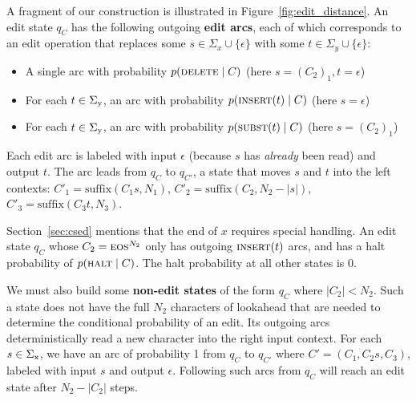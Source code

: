 \documentclass[11pt,letterpaper]{article}
\newcommand{\Sigmax}{\Sigma_{\text x}}
\newcommand{\Sigmay}{\Sigma_{\text y}}
\newcommand{\eos}{\textsc{eos}\xspace}
\newcommand{\SkipForSpace}[1]{}
\begin{document}
A fragment of our construction is illustrated in Figure~\ref{fig:edit_distance}. 
An edit state $q_C$ has the following outgoing {\bf edit arcs}, each of which corresponds to an edit operation that replaces some $s \in \Sigma_x \cup \{\epsilon\}$ with some $t \in \Sigma_y \cup \{\epsilon\}$:
\begin{itemize}[noitemsep]
\item A single arc with probability $p(\textsc{delete} \mid C)$ (here $s=(C_2)_1, t=\epsilon$)
\item For each $t \in \Sigmay$, an arc with probability $p(\textsc{insert}(t) \mid C)$ (here $s=\epsilon$)
\item For each $t \in \Sigmay$, an arc with probability $p(\textsc{subst}(t) \mid C)$ (here $s=(C_2)_1$)
\end{itemize}
Each edit arc is labeled with input $\epsilon$ (because $s$ has {\em already} been read) and output $t$.  The arc leads from $q_C$ to $q_{C'}$, a state that moves $s$ and $t$ into the left contexts: 
$C'_1=\text{suffix}(C_1s,N_1)$, 
$C'_2=\text{suffix}(C_2,N_2-|s|)$,
$C'_3=\text{suffix}(C_3t,N_3)$.

Section~\ref{sec:csed} mentions that the end of $x$ requires special handling.  An edit state $q_C$ whose $C_2=\eos^{N_2}$ only has outgoing $\textsc{insert}(t)$ arcs, and has a halt probability of $p(\textsc{halt} \mid C)$.  The halt probability at all other states is 0.
\SkipForSpace{\footnote{If $N_2=0$, we must tweak our construction to distinguish the end-of-string case: an edit state's $C_2$ cannot be empty, but consists of a nondeterministically guessed bit that indicates whether the next input character will be \eos (see footnotes~\ref{fn:eosbit} and~\ref{fn:nondet}).  
We omit the details for space reasons, as $N_2=0$ is not very useful (it cannot even distinguish {\sc copy} from {\sc subst}).  However, our code does handle this case.}}


We must also build some {\bf non-edit states} of the form $q_C$ where $|C_2| < N_2$.  Such a state does not have the full $N_2$ characters of lookahead that are needed to determine the conditional probability of an edit.  Its outgoing arcs deterministically read a new character into the right input context.  For each $s \in \Sigmax$, we have an arc of probability 1 from $q_C$ to $q_{C'}$ where $C' = (C_1, C_2s, C_3)$, labeled with input $s$ and output $\epsilon$.  Following such arcs from $q_C$ will reach an edit state after $N_2-|C_2|$ steps.  
\end{document}
